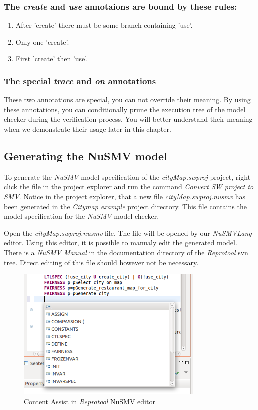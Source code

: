 \subsubsection{The \emph{create} and \emph{use} annotaions are bound by these rules:}

\begin{enumerate}
  \item After 'create' there must be some branch containing 'use'.
  \item Only one 'create'.
  \item First 'create' then 'use'.
\end{enumerate}

\subsubsection{The special \emph{trace} and \emph{on} annotations}
These two annotations are special, you can not override their meaning. By using these annotations, you can conditionally prune the
execution tree of the model checker during the verification process. You will better understand their meaning when we demonstrate
their usage later in this chapter.

\subsection{Generating the NuSMV model}
To generate the \emph{NuSMV} model specification of the \emph{cityMap.swproj} project, right-click the file in the project explorer
and run the command \emph{Convert SW project to SMV}. Notice in the project explorer, that a new file \emph{cityMap.swproj.nusmv} has
been generated in the \emph{Citymap example} project directory. This file contains the model specification for the \emph{NuSMV} model checker.

Open the \emph{cityMap.swproj.nusmv} file. The file will be opened by our \mbox{\emph{NuSMVLang}} editor. Using this editor, it is possible to manualy edit the generated model.
There is a \emph{NuSMV Manual} in the documentation directory of the \emph{Reprotool} svn tree. Direct editing of this
file should however not be necessary.

\begin{figure}[ht]
  \centering
  \includegraphics[height=180pt]{images/reprotoolNuSMVContentAssist}
  \caption{Content Assist in \emph{Reprotool} NuSMV editor}
  \label{fig:reprotoolNuSMVContentAssist}
\end{figure}


